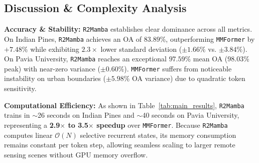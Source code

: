 \documentclass[conference]{IEEEtran}
\begin{document}
\begin{table}[t]
\centering
\caption{Benchmark Classification Results ($\text{Mean} \pm \text{Std}$, 3 Seeds)}
\label{tab:main_results}
\end{table}

\subsection{Discussion & Complexity Analysis}
\textbf{Accuracy & Stability:} \texttt{R2Mamba} establishes clear dominance across all metrics. On Indian Pines, \texttt{R2Mamba} achieves an OA of $83.89\%$, outperforming \texttt{MMFormer} by $+7.48\%$ while exhibiting $2.3\times$ lower standard deviation ($\pm 1.66\%$ vs. $\pm 3.84\%$). On Pavia University, \texttt{R2Mamba} reaches an exceptional $97.59\%$ mean OA ($98.03\%$ peak) with near-zero variance ($\pm 0.60\%$). \texttt{MMFormer} suffers from noticeable instability on urban boundaries ($\pm 5.98\%$ OA variance) due to quadratic token sensitivity.

\textbf{Computational Efficiency:} As shown in Table~\ref{tab:main_results}, \texttt{R2Mamba} trains in $\sim$26 seconds on Indian Pines and $\sim$40 seconds on Pavia University, representing a \textbf{2.9$\times$ to 3.5$\times$ speedup} over \texttt{MMFormer}. Because \texttt{R2Mamba} computes linear $\mathcal{O}(N)$ selective recurrent states, its memory consumption remains constant per token step, allowing seamless scaling to larger remote sensing scenes without GPU memory overflow.
\end{document}
